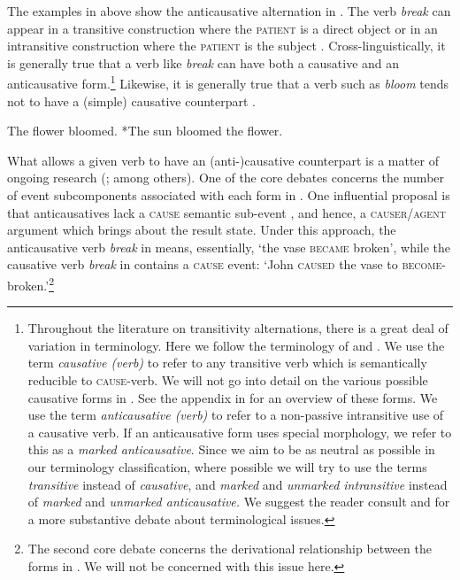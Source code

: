 \documentclass[output=paper]{langsci/lanmgscibook}
\begin{document}
The examples in  above show the anticausative alternation in . The verb \textit{break} can appear in a transitive construction where the \textsc{patient} is a direct object  or in an intransitive construction where the \textsc{patient} is the subject . Cross-linguistically, it is generally true that a verb like \textit{break} can have both a causative and an anticausative form.\footnote{Throughout the literature on transitivity alternations, there is a great deal of variation in terminology. Here we follow the terminology of \citet{Schäfer2008,Schäfer2009} and \citet{AlexiadouEtAl2015}. We use the term \textit{causative (verb)} to refer to any transitive verb which is semantically reducible to \textsc{cause}-verb. We will not go into detail on the various possible causative forms in . See the appendix in \citet{GluckmanBowler2015} for an overview of these forms. We use the term \textit{anticausative (verb)} to refer to a non-passive intransitive use of a causative verb. If an anticausative form uses special morphology, we refer to this as a \textit{marked anticausative}. Since we aim to be as neutral as possible in our terminology classification, where possible we will try to use the terms \textit{transitive} instead of \textit{causative}, and \textit{marked} and \textit{unmarked intransitive} instead of \textit{marked} and \textit{unmarked anticausative.} We suggest the reader consult \citet{Schäfer2008,Schäfer2009} and \citet{AlexiadouEtAl2015} for a more substantive debate about terminological issues.} Likewise, it is generally true that a verb such as \textit{bloom}  tends not to have a (simple) causative counterpart .

\ea\label{ex:gluckman:3} 
\ea\label{ex:gluckman:3a}
 The flower bloomed.        
\ex\label{ex:gluckman:3b}
  *The sun bloomed the flower.      
 \z
 \z
 
What allows a given verb to have an (anti-)causative counterpart is a matter of ongoing research (\citealt{Smith1970,Haspelmath1993,Levin1995,Reinhart1996,Folli2002,FolliHarley2005,AlexiadouAnagnostopoulou2006,Schäfer2008}; among others). One of the core debates concerns the number of event subcomponents associated with each form in . One influential proposal is that anticausatives lack a \textsc{cause} semantic sub-event \citep{Haspelmath1993}, and hence, a \textsc{causer/agent} argument which brings about the result state. Under this approach, the anticausative verb \textit{break} in  means, essentially, ‘the vase \textsc{became} broken’, while the causative verb \textit{break} in  contains a \textsc{cause} event: ‘John \textsc{caused} the vase to \textsc{become}-broken.’\footnote{The second core debate concerns the derivational relationship between the forms in . We will not be concerned with this issue here.}
\end{document}
